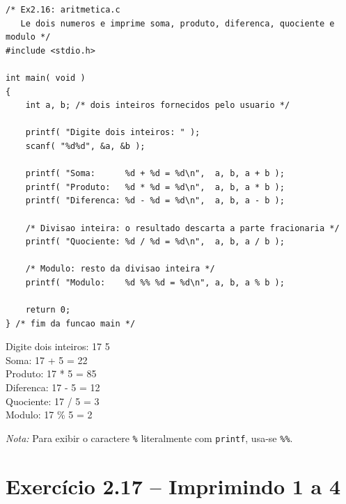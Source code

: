 \documentclass[12pt,a4paper]{article}
\begin{document}
\begin{respostabox}[title={Exercício 2.16 -- Programa de aritmética}]
\begin{lstlisting}
/* Ex2.16: aritmetica.c
   Le dois numeros e imprime soma, produto, diferenca, quociente e modulo */
#include <stdio.h>

int main( void )
{
    int a, b; /* dois inteiros fornecidos pelo usuario */

    printf( "Digite dois inteiros: " );
    scanf( "%d%d", &a, &b );

    printf( "Soma:      %d + %d = %d\n",  a, b, a + b );
    printf( "Produto:   %d * %d = %d\n",  a, b, a * b );
    printf( "Diferenca: %d - %d = %d\n",  a, b, a - b );

    /* Divisao inteira: o resultado descarta a parte fracionaria */
    printf( "Quociente: %d / %d = %d\n",  a, b, a / b );

    /* Modulo: resto da divisao inteira */
    printf( "Modulo:    %d %% %d = %d\n", a, b, a % b );

    return 0;
} /* fim da funcao main */
\end{lstlisting}

\begin{saida}
Digite dois inteiros: 17 5\\
Soma:      17 + 5 = 22\\
Produto:   17 * 5 = 85\\
Diferenca: 17 - 5 = 12\\
Quociente: 17 / 5 = 3\\
Modulo:    17 \% 5 = 2
\end{saida}

\textit{Nota:} Para exibir o caractere \texttt{\%} literalmente com \texttt{printf}, usa-se \texttt{\%\%}.
\end{respostabox}

\section{Exercício 2.17 -- Imprimindo 1 a 4}
\end{document}
